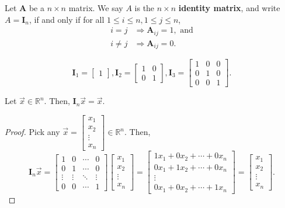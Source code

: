 \documentclass[]{book}
\newcommand{\vecxxdx}[1][x]{\ensuremath{\begin{bmatrix}
#1_1 \\
#1_2 \\
\vdots \\
#1_n
\end{bmatrix}}}
\newcommand{\mat}[1]{\ensuremath{\mathbf{#1}}}
\newcommand{\idmat}[1][n]{\ensuremath{\mat{I}_#1}}
\newcommand{\imat}{\ensuremath{\begin{bmatrix}
1 & 0 & \cdots & 0 \\
0 & 1 & \cdots & 0 \\
\vdots & \vdots & \ddots & \vdots \\
0 & 0 & \cdots & 1\end{bmatrix}}}
\newcommand{\R}{\ensuremath{\mathbb{R}}}
\begin{document}
\begin{definition}
    \label{defn:identity matrix}
    Let $\mat{A}$ be a $n\times n$ matrix. We say $A$ is the $n \times n$ \textbf{identity matrix}, and write $A=\idmat$, if and only if for all $1 \leq i \leq n, 1 \leq j \leq n$,
    \begin{align*}
        i = j &\Longrightarrow \mat{A}_{ij} = 1, \text{ and} \\
        i \neq j &\Longrightarrow \mat{A}_{ij}=0.
    \end{align*}
\end{definition}
\begin{example}
    \[\idmat[1] = \begin{bmatrix}1\end{bmatrix}, \idmat[2] = \begin{bmatrix}1 & 0 \\ 0 & 1\end{bmatrix}, \idmat[3] = \begin{bmatrix}1&0&0\\0&1&0\\0&0&1\end{bmatrix}.\]
\end{example}
\begin{theorem}
    \label{thm: identity matrix gives identity}
    Let $\vec{x} \in \R^n$. Then, $\idmat[n] \vec{x} = \vec{x}$.
\begin{proof}
    Pick any $\vec{x}=\vecxxdx \in \R^n$. Then,
    \[\idmat[n]\vec{x} = \imat \vecxxdx = \begin{bmatrix}1x_1 + 0x_2 + \cdots + 0x_n \\ 0x_1 + 1x_2 + \cdots + 0x_n \\ \vdots \\ 0x_1 + 0x_2 + \cdots + 1x_n\end{bmatrix} = \vecxxdx.\]
\end{proof}
\end{theorem}
\end{document}

